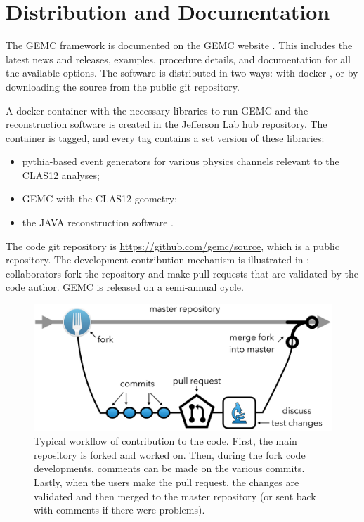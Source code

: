 \section{Distribution and Documentation}

The GEMC framework is documented on the GEMC website \cite{GEMC}. This includes the latest news and releases,
examples, procedure details, and documentation for all the available options.
The software is distributed in two ways: with docker \cite{jlabDocker}, or by downloading the source from the public git repository.

A docker container with the necessary libraries to run GEMC and the reconstruction software
is created in the Jefferson Lab hub repository.
The container is tagged, and every tag contains a set version of these libraries:

\begin{itemize}
	\item pythia-based event generators for various physics channels relevant to the CLAS12 analyses;
	\item GEMC with the CLAS12 geometry;
	\item the JAVA reconstruction software \cite{recon-nim}.
\end{itemize}


The code git repository is \url{https://github.com/gemc/source}, which is a public repository.
The development contribution mechanism is illustrated in : collaborators fork the repository
and make pull requests that are validated by the code author.
GEMC is released on a semi-annual cycle.

\begin{figure}
	\centering
	\includegraphics[width=0.99\columnwidth,keepaspectratio]{img/github.png}
	\caption{Typical workflow of contribution to the code. First, the main repository is forked and worked on. Then, during the fork code developments,
	         comments can be made on the various commits. Lastly, when the users make the pull request, the changes are validated and then merged
             to the master repository (or sent back with comments if there were problems).}
	\label{fig:github}
\end{figure}


